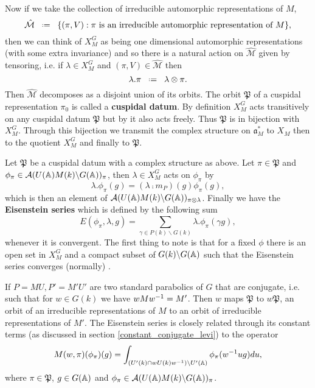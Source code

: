Now if we take the collection of irreducible automorphic representations of \(M\),
 \[\hat{\mathcal{M}} \defeq \{(\pi, V) : \pi \text{ is an irreducible automorphic representation of }M\},\]
then we can think of \(X_M^G\) as being one dimensional automorphic representations (with some extra invariance) and so there is a natural action on \(\hat{\mathcal{M}}\) given by tensoring, i.e. if \(\lambda\in X_M^G\) and \((\pi, V)\in \hat{\mathcal{M}}\) then 
\[\lambda.\pi \defeq \lambda\tensor \pi.\]
Then \(\hat{\mathcal{M}}\) decomposes as a disjoint union of its orbits. The orbit \(\mathfrak{P}\) of a cuspidal representation \(\pi_0\) is called a \textbf{cuspidal datum}. By definition \(X_M^G\) acts transitively on any cuspidal datum \(\mathfrak{P}\) but by \cite[II.1]{moeglinSpectralDecompositionEisenstein1995} it also acts freely. Thus \(\mathfrak{P}\) is in bijection with \(X_M^G\). Through this bijection we transmit the complex structure on \(\mathfrak{a}_M^*\) to \(X_M\) then to the quotient \(X_M^G\) and finally to \(\mathfrak{P}\).

Let \(\mathfrak{P}\) be a cuspidal datum with a complex structure as above. Let \(\pi\in \mathfrak{P}\) and \(\phi_\pi \in \mathcal{A}(U(\A)M(k)\backslash G(\A))_\pi\), then \(\lambda\in X_M^G\) acts on \(\phi_\pi\) by 
\[\lambda.\phi_\pi(g) = (\lambda \comp m_P)(g) \phi_\pi(g),\]
which is then an element of \(\mathcal{A}(U(\A)M(k)\backslash G(\A))_{\pi\tensor \lambda}\). Finally we have the \textbf{Eisenstein series} which is defined by the following sum
\[E(\phi_\pi, \lambda, g) = \sum_{\gamma \in P(k)\backslash G(k)} \lambda.\phi_\pi(\gamma g),\]
whenever it is convergent. The first thing to note is that for a fixed \(\phi\) there is an open set in \(X_M^G\) and a compact subset of \(G(k)\backslash G(\A)\) such that the Eisenstein series converges (normally) \cite[II.1.5]{moeglinSpectralDecompositionEisenstein1995}.

If \(P = MU, P' = M'U'\) are two standard parabolics of \(G\) that are conjugate, i.e. such that for \(w\in G(k)\) we have \(wMw^{-1} = M'\).
Then \(w\) maps \(\mathfrak{P}\) to \(w\mathfrak{P}\), an orbit of an irreducible representations of \(M\) to an orbit of irreducible representations of \(M'\).
The Eisenstein series is closely related through its constant terms (as discussed in section \ref{constant_conjugate_levi}) to the operator
\[M(w, \pi)(\phi_\pi)(g) = \int_{(U'(k)\cap wU(k)w\inv )\backslash U'(\A)} \phi_\pi(w\inv ug) du,\]
where \(\pi\in \mathfrak{P}\), \(g\in G(\A)\) and \(\phi_\pi \in \mathcal{A}(U(\A)M(k)\backslash G(\A))_\pi\).

